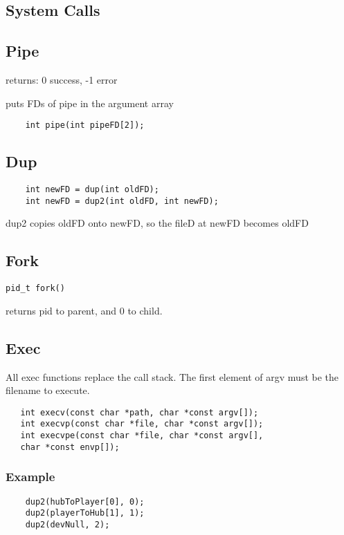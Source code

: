 \documentclass[10pt, a4paper, leqno]{article}
\begin{document}
\begin{multicols}{2}

\section {System Calls}

    \subsection{Pipe}

    returns: 0 success, -1 error

    puts FDs of pipe in the argument array

    \begin{verbatim}
    int pipe(int pipeFD[2]);
    \end{verbatim}

    \subsection{Dup}

    \begin{verbatim}
    int newFD = dup(int oldFD);
    int newFD = dup2(int oldFD, int newFD);
    \end{verbatim}
    dup2 copies oldFD onto newFD, so the fileD at newFD becomes oldFD

    \subsection {Fork} 

    \texttt{pid\_t fork()}

    returns pid to parent, and 0 to child. 


    \subsection{Exec}

    All exec functions replace the call stack. 
    The first element of argv must be the filename to execute. 

    \begin{verbatim}
   int execv(const char *path, char *const argv[]);
   int execvp(const char *file, char *const argv[]);
   int execvpe(const char *file, char *const argv[],
   char *const envp[]);
\end{verbatim}
    \subsubsection {Example}
    \begin{verbatim}
    dup2(hubToPlayer[0], 0);
    dup2(playerToHub[1], 1);
    dup2(devNull, 2);


\end{verbatim}
\end{multicols}
\end{document}
